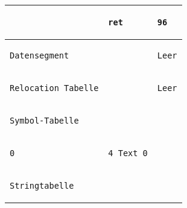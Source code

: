 \documentclass{ti2}
\begin{document}
\begin{tabular}{ | l | l | l|}
\begin{lstlisting}
\end{lstlisting} &
\begin{lstlisting}
ret
\end{lstlisting} &
\begin{lstlisting}
96
\end{lstlisting} \\ \hline \hline

\begin{lstlisting}
Datensegment
\end{lstlisting} &
\begin{lstlisting}
\end{lstlisting} &
\begin{lstlisting}
Leer
\end{lstlisting} \\ \hline \hline

\begin{lstlisting}
Relocation Tabelle
\end{lstlisting} &
\begin{lstlisting}
\end{lstlisting} &
\begin{lstlisting}
Leer
\end{lstlisting} \\ \hline  
 \hline

\begin{lstlisting}
Symbol-Tabelle
\end{lstlisting} &
\begin{lstlisting}
\end{lstlisting} &
\begin{lstlisting}
\end{lstlisting} \\ \hline

\begin{lstlisting}
0
\end{lstlisting} &
\begin{lstlisting}
4 Text 0
\end{lstlisting} &
\begin{lstlisting}
\end{lstlisting} \\ \hline \hline

\begin{lstlisting}
Stringtabelle
\end{lstlisting} &
\begin{lstlisting}

\end{lstlisting} &
\begin{lstlisting}
\end{lstlisting} \\ \hline


\end{tabular}
\end{document}
